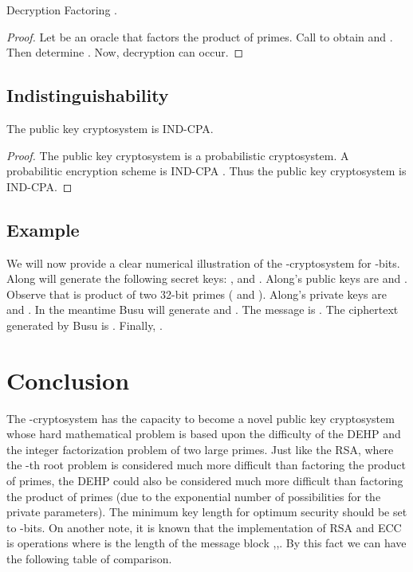 \documentclass{llncs}
\begin{document}
\begin{proposition}
Decryption  Factoring .
\end{proposition}
\begin{proof}
Let  be an oracle that factors the product of primes.
Call  to obtain  and . Then determine
. Now, decryption can occur.
\end{proof}

\subsection{Indistinguishability}
\begin{proposition}
The  public key cryptosystem is IND-CPA.
\end{proposition}
\begin{proof}
The  public key cryptosystem is a probabilistic
cryptosystem. A probabilitic encryption scheme is IND-CPA
\cite{16}. Thus the  public key cryptosystem is IND-CPA.

\end{proof}

\subsection{Example}
We will now provide a clear numerical illustration of the
-cryptosystem for -bits. Along will generate the
following secret keys: 
,  and .
Along's public keys are  and
. Observe that  is product of
two 32-bit primes ( and ). Along's
private keys are  and . In the
meantime Busu will generate  and . The message is
. The ciphertext generated
by Busu is . Finally,
.

\section{Conclusion}
The -cryptosystem has the capacity to become a novel
public key cryptosystem whose hard mathematical problem is based
upon the difficulty of the DEHP and the integer factorization
problem of two large primes. Just like the RSA, where the -th
root problem is considered much more difficult than factoring the
product of primes, the DEHP could also be considered much more
difficult than factoring the product of primes (due to the
exponential number of possibilities for the private parameters).
The minimum key length for optimum security should be set to
-bits. On another note, it is known that the implementation
of RSA and ECC is  operations where  is the length of
the message block \cite{5},\cite{8},\cite{17}. By this fact we can
have the following table of comparison.
\\
\end{document}
